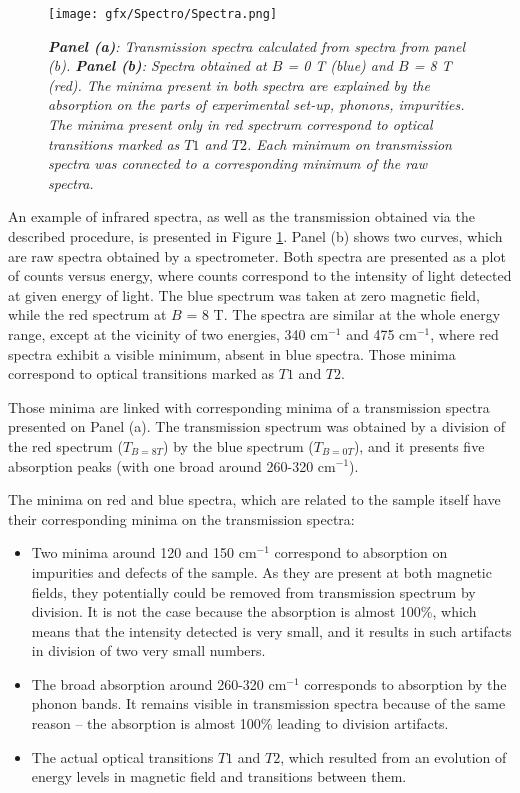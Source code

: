 \documentclass[titlepage,a4paper]{book}
\begin{document}
\begin{figure}[ht]
	\centering
	\texttt{[image: gfx/Spectro/Spectra.png]}
	\vspace{-10pt}
	\caption{\textit{\textbf{Panel (a)}: Transmission spectra calculated from spectra from panel (b). \textbf{Panel (b)}: Spectra obtained at $B$ = 0 T (blue) and $B$ = 8 T (red). The minima present in both spectra are explained by the absorption on the parts of experimental set-up, phonons, impurities. The minima present only in red spectrum correspond to optical transitions marked as $T1$ and $T2$. Each minimum on transmission spectra was connected to a corresponding minimum of the raw spectra.}}
	\label{fig:Spectra}
\end{figure}
An example of infrared spectra, as well as the transmission obtained via the described procedure, is presented in Figure \ref{fig:Spectra}. Panel (b) shows two curves, which are raw spectra obtained by a spectrometer. Both spectra are presented as a plot of counts versus energy, where counts correspond to the intensity of light detected at given energy of light. The blue spectrum was taken at zero magnetic field, while the red spectrum at $B$ = 8 T. The spectra are similar at the whole energy range, except at the vicinity of two energies, 340 cm$^{-1}$ and 475 cm$^{-1}$, where red spectra exhibit a visible minimum, absent in blue spectra. Those minima correspond to optical transitions marked as $T1$ and $T2$. 

Those minima are linked with corresponding minima of a transmission spectra presented on Panel (a). The transmission spectrum was obtained by a division of the red spectrum ($T_{B=8T}$) by the blue spectrum ($T_{B=0T}$), and it presents five absorption peaks (with one broad around 260-320 cm$^{-1}$). 

The minima on red and blue spectra, which are related to the sample itself have their corresponding minima on the transmission spectra:
\begin{itemize}
\item Two minima around 120 and 150 cm$^{-1}$ correspond to absorption on impurities and defects of the sample. As they are present at both magnetic fields, they potentially could be removed from transmission spectrum by division. It is not the case because the absorption is almost 100\%, which means that the intensity detected is very small, and it results in such artifacts in division of two very small numbers.
\item The broad absorption around 260-320 cm$^{-1}$ corresponds to absorption by the phonon bands. It remains visible in transmission spectra because of the same reason -- the absorption is almost 100\% leading to division artifacts.
\item The actual optical transitions $T1$ and $T2$, which resulted from an evolution of energy levels in magnetic field and transitions between them.
\end{itemize}
\end{document}
